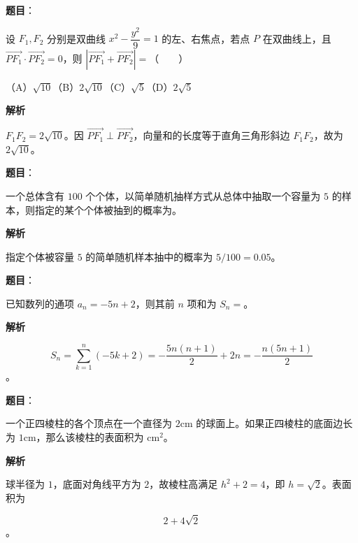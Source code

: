 \begin{answer}

\textbf{题目}：

设 $F_1,F_2$ 分别是双曲线 $x^2-\dfrac{y^2}{9}=1$ 的左、右焦点，若点 $P$ 在双曲线上，且 $\overrightarrow{PF_1}\cdot\overrightarrow{PF_2}=0$，则 $|\overrightarrow{PF_1}+\overrightarrow{PF_2}|=$\mbox{（　　）}

（A）$\sqrt{10}$\quad（B）$2\sqrt{10}$\quad（C）$\sqrt5$\quad（D）$2\sqrt5$

\textbf{解析}

$F_1F_2=2\sqrt{10}$。因 $\overrightarrow{PF_1}\perp\overrightarrow{PF_2}$，向量和的长度等于直角三角形斜边 $F_1F_2$，故为 $2\sqrt{10}$。


\end{answer}
\begin{answer}

\textbf{题目}：

一个总体含有 $100$ 个个体，以简单随机抽样方式从总体中抽取一个容量为 $5$ 的样本，则指定的某个个体被抽到的概率为\gkblank{}。

\textbf{解析}

指定个体被容量 $5$ 的简单随机样本抽中的概率为 $5/100=0.05$。


\end{answer}
\begin{answer}

\textbf{题目}：

已知数列的通项 $a_n=-5n+2$，则其前 $n$ 项和为 $S_n=$\gkblank{}。

\textbf{解析}

\nopagebreak[4]
\[
S_n=\sum_{k=1}^n(-5k+2)
=-\frac{5n(n+1)}2+2n
=-\frac{n(5n+1)}2
\]
。


\end{answer}
\begin{answer}

\textbf{题目}：

一个正四棱柱的各个顶点在一个直径为 $2\mathrm{cm}$ 的球面上。如果正四棱柱的底面边长为 $1\mathrm{cm}$，那么该棱柱的表面积为\gkblank{} $\mathrm{cm}^2$。

\textbf{解析}

球半径为 $1$，底面对角线平方为 $2$，故棱柱高满足 $h^2+2=4$，即 $h=\sqrt2$。表面积为

\nopagebreak[4]
\[
2+4\sqrt2
\]
。


\end{answer}
